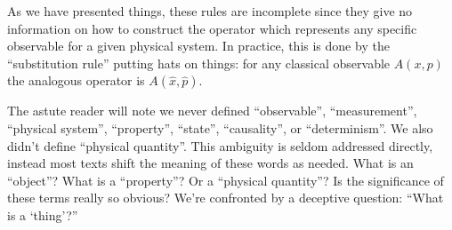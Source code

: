 As we have presented things, these rules are incomplete since they give
no information on how to construct the operator which represents any
specific observable for a given physical system. In practice, this is
done by the ``substitution rule'' putting hats on things: for any
classical observable $A(x, p)$ the analogous operator is
$A(\widehat{x},\widehat{p})$. 

\begin{danger}
The astute reader will note we never defined ``observable'',
``measurement'', ``physical system'', ``property'', ``state'',
``causality'', or ``determinism''. We also didn't define ``physical quantity''.
This ambiguity is seldom addressed directly, instead most texts shift
the meaning of these words as needed. What is an ``object''? What is a
``property''? Or a ``physical quantity''? Is the significance of these
terms really so obvious? We're confronted by a deceptive question: ``What
is a `thing'?''
\end{danger}



